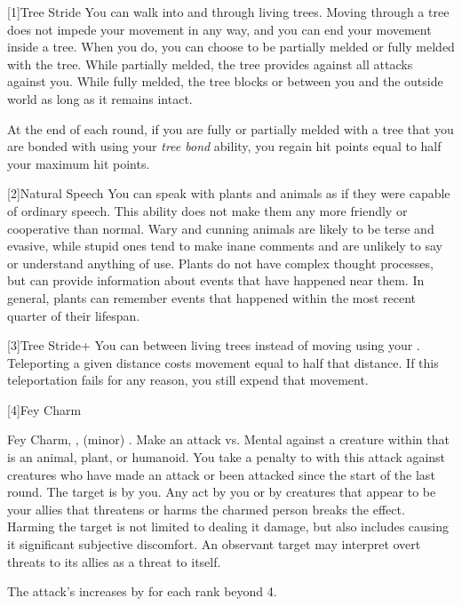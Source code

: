 [1]{Tree Stride} You can walk into and through living trees.
Moving through a tree does not impede your movement in any way, and you can end your movement inside a tree.
When you do, you can choose to be partially melded or fully melded with the tree.
While partially melded, the tree provides  against all attacks against you.
While fully melded, the tree blocks  or  between you and the outside world as long as it remains intact.

At the end of each round, if you are fully or partially melded with a tree that you are bonded with using your \textit{tree bond} ability, you regain hit points equal to half your maximum hit points.

[2]{Natural Speech} You can speak with plants and animals as if they were capable of ordinary speech.
This ability does not make them any more friendly or cooperative than normal.
Wary and cunning animals are likely to be terse and evasive, while stupid ones tend to make inane comments and are unlikely to say or understand anything of use.
Plants do not have complex thought processes, but can provide information about events that have happened near them.
In general, plants can remember events that happened within the most recent quarter of their lifespan.

[3]{Tree Stride+} You can  between living trees instead of moving using your .
Teleporting a given distance costs movement equal to half that distance.
If this teleportation fails for any reason, you still expend that movement.

[4]{Fey Charm}
\begin{magicalsustainability}{Fey Charm}{, ,  (minor)}
	\abilityusagetime {}.
	\rankline
	Make an attack vs. Mental against a creature within \medrange that is an animal, plant, or humanoid.
	You take a  penalty to  with this attack against creatures who have made an attack or been attacked since the start of the last round.
	\hit The target is \charmed by you.
	Any act by you or by creatures that appear to be your allies that threatens or harms the charmed person breaks the effect.
	Harming the target is not limited to dealing it damage, but also includes causing it significant subjective discomfort.
	An observant target may interpret overt threats to its allies as a threat to itself.

	\rankline

	\noindent The attack's  increases by  for each rank beyond 4.
\end{magicalsustainability}

